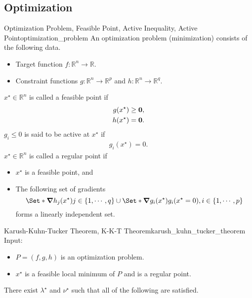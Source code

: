 \documentclass{article}
\begin{document}
\subsection{Optimization}

\begin{definition}{Optimization Problem, Feasible Point, Active Inequality, Active Point}{optimization_problem}
    An optimization problem (minimization) consists of the following data.
    \begin{itemize}
        \item Target function $f:\mathbb{R}^n\rightarrow\mathbb{R}$.
        \item Constraint functions $g:\mathbb{R}^n\rightarrow\mathbb{R}^p$ and $h:\mathbb{R}^n\rightarrow\mathbb{R}^q$.
    \end{itemize}
    $x^\star\in\mathbb{R}^n$ is called a feasible point if
    \begin{align*}
        g(x^\star) \ge \vb{0}, \\
        h(x^\star) = \vb{0}.
    \end{align*}
    $g_i\le 0$ is said to be active at $x^\star$ if
    \begin{align*}
        g_i(x^\star) = 0.
    \end{align*}
    $x^\star\in\mathbb{R}^n$ is called a regular point if
    \begin{itemize}
        \item $x^\star$ is a feasible point, and
        \item The following set of gradients
        \[ \Set*{\grad h_j(x^\star)}{j\in\qty{1,\cdots,q}} \cup \Set*{\grad g_i(x^\star)}{g_i(x^\star = 0), i\in\qty{1,\cdots,p}} \]
        forms a linearly independent set.
    \end{itemize}
\end{definition}

\begin{theorem}{Karush-Kuhn-Tucker Theorem, K-K-T Theorem}{karush_kuhn_tucker_theorem}
    Input:
    \begin{itemize}
        \item $P = (f,g,h)$ is an optimization problem.
        \item $x^\star$ is a feasible local minimum of $P$ and is a regular point.
    \end{itemize}
    There exist $\lambda^\star$ and $\nu^\star$ such that all of the following are satisfied.
\end{theorem}
\end{document}
